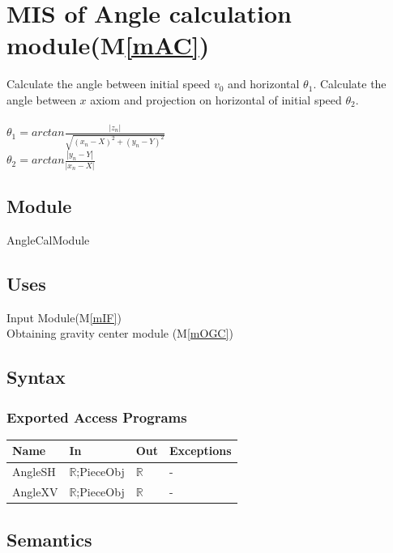 \documentclass[12pt, titlepage]{article}
\newcommand{\mref}[1]{M\ref{#1}}
\begin{document}
\section{MIS of Angle calculation module(\mref{mAC})} 
Calculate the angle between initial speed $v_{0}$ and horizontal $\theta_{1}$. Calculate the angle between $x$ axiom and projection on horizontal of initial speed $\theta_{2}$. \\
\\
$\theta_{1}=arctan \frac{|z_{n}|}{\sqrt{(x_{n}-X)^2+(y_{n}-Y)^2}}$\\
$\theta_{2}=arctan \frac{|y_{n}-Y|}{|x_{n}-X|}$\\
\subsection{Module}

AngleCalModule

\subsection{Uses}

Input Module(\mref{mIF})\\
Obtaining gravity center module (\mref{mOGC})

\subsection{Syntax}

\subsubsection{Exported Access Programs}

\begin{center}
	\begin{tabular}{p{2cm} p{4cm} p{4cm} p{2cm}}
		\hline
		\textbf{Name} & \textbf{In} & \textbf{Out} & \textbf{Exceptions} \\
		\hline
		AngleSH & $\mathbb{R}$;PieceObj & $\mathbb{R}$ & - \\
		AngleXV & $\mathbb{R}$;PieceObj & $\mathbb{R}$ & - \\
		\hline
	\end{tabular}
\end{center}

\subsection{Semantics}
\end{document}
